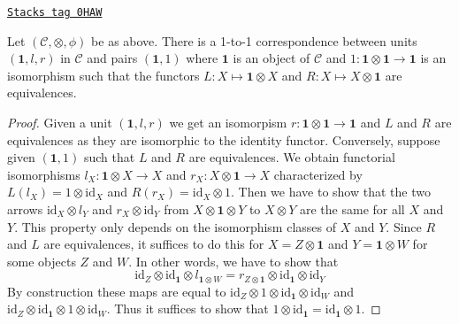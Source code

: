 \begin{lemma}
\label{categories-lemma-monoidal-unit}
\href{https://stacks.math.columbia.edu/tag/0HAW}{\texttt{Stacks tag 0HAW}}

Let $(\mathcal{C}, \otimes, \phi)$ be as above. There is a 1-to-1
correspondence between units $(\mathbf{1}, l, r)$ in $\mathcal{C}$ and pairs
$(\mathbf{1}, 1)$ where $\mathbf{1}$ is an object of $\mathcal{C}$ and
$1 : \mathbf{1} \otimes \mathbf{1} \to \mathbf{1}$
is an isomorphism such that the functors $L : X \mapsto \mathbf{1} \otimes X$
and $R : X \mapsto X \otimes \mathbf{1}$ are equivalences.
\end{lemma}

\begin{proof}
Given a unit $(\mathbf{1}, l, r)$ we get an isomorpism
$r : \mathbf{1} \otimes \mathbf{1} \to \mathbf{1}$ and $L$ and $R$ are
equivalences as they are isomorphic to the identity functor.
Conversely, suppose given $(\mathbf{1}, 1)$ such that
$L$ and $R$ are equivalences. We obtain functorial isomorphisms
$l_X : \mathbf{1} \otimes X \to X$ and $r_X : X \otimes \mathbf{1} \to X$
characterized by $L(l_X) = 1 \otimes \text{id}_X$ and
$R(r_X) = \text{id}_X \otimes 1$. Then we have to show that the two
arrows $\text{id}_X \otimes l_Y$ and $r_X \otimes \text{id}_Y$ from
$X \otimes \mathbf{1} \otimes Y$ to $X \otimes Y$ are the same
for all $X$ and $Y$. This property only depends on the isomorphism
classes of $X$ and $Y$.
Since $R$ and $L$ are equivalences, it suffices to
do this for $X = Z \otimes \mathbf{1}$ and $Y = \mathbf{1} \otimes W$
for some objects $Z$ and $W$.
In other words, we have to show that
$$
\text{id}_Z \otimes \text{id}_\mathbf{1} \otimes l_{\mathbf{1} \otimes W}
=
r_{Z \otimes \mathbf{1}} \otimes \text{id}_\mathbf{1} \otimes \text{id}_Y
$$
By construction these maps are equal to
$\text{id}_Z \otimes 1 \otimes \text{id}_\mathbf{1} \otimes \text{id}_W$ and
$\text{id}_Z \otimes \text{id}_\mathbf{1} \otimes 1 \otimes \text{id}_W$.
Thus it suffices to show that
$1 \otimes \text{id}_\mathbf{1} = \text{id}_\mathbf{1} \otimes 1$.


\end{proof}
